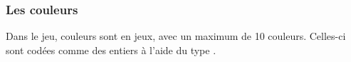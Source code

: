 

\subsubsection{Les couleurs}
\label{colors}


Dans le jeu,  couleurs sont en jeux, avec un maximum de 10 couleurs. Celles-ci sont codées comme des entiers à l'aide du type .

